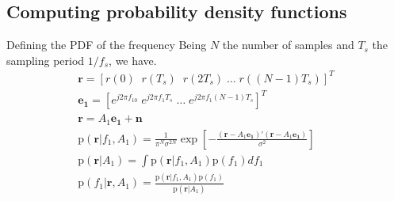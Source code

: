 ﻿\documentclass[mathserif]{beamer}
\begin{document}
	\subsection{Computing probability density functions}
	\begin{frame}{Defining the PDF of the frequency}
		Being $N$ the number of samples and $T_s$ the sampling period $1/f_s$, we have.
		\begin{gather*}
			\mathbf{r} =  [r(0) \; \; r(T_s) \; \; r(2T_s) \; \dots \; r((N-1)T_s)]^T \\
			\mathbf{e_1} =  [e^{j2\pi f_10} \; e^{j2\pi f_1T_s} \; \dots \; e^{j2\pi f_1(N-1)T_s}]^T \\		
			\mathbf{r} = A_1\mathbf{e_1} + \mathbf{n} \\
			\mathrm{p}(\mathbf{r}|f_1,A_1) = \frac{1}{\pi^N\sigma^{2N}}\exp\left[-\frac{(\mathbf{r}-A_1\mathbf{e_1})'
				(\mathbf{r}-A_1\mathbf{e_1})}{\sigma^2}\right] \\
			\mathrm{p}(\mathbf{r}|A_1) = \int \mathrm{p}(\mathbf{r}|f_1,A_1)\mathrm{p}(f_1)df_1\\
			\mathrm{p}(f_1|\mathbf{r},A_1) = \frac{\mathrm{p}(\mathbf{r}|f_1,A_1)\mathrm{p}(f_1)}{\mathrm{p}(\mathbf{r}|A_1)} \\
		\end{gather*}
	\end{frame}
	
\end{document}
